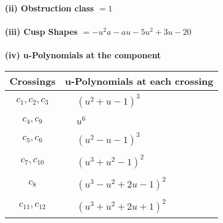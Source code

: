 \documentclass[1p]{elsarticle_modified}
\theoremstyle{definition}
\begin{document}
\flushleft \textbf{(ii) Obstruction class $= 1$}\\~\\
\flushleft \textbf{(iii) Cusp Shapes $= - u^2 a- a u-5 u^2+3 u-20$}\\~\\
\newpage\renewcommand{\arraystretch}{1}
\flushleft \textbf{(iv) u-Polynomials at the component}\newline \\
\begin{tabular}{m{50pt}|m{274pt}}
Crossings & \hspace{64pt}u-Polynomials at each crossing \\
\hline $$\begin{aligned}c_{1},c_{2},c_{3}\end{aligned}$$&$\begin{aligned}
&(u^2+u-1)^3
\end{aligned}$\\
\hline $$\begin{aligned}c_{4},c_{9}\end{aligned}$$&$\begin{aligned}
&u^6
\end{aligned}$\\
\hline $$\begin{aligned}c_{5},c_{6}\end{aligned}$$&$\begin{aligned}
&(u^2- u-1)^3
\end{aligned}$\\
\hline $$\begin{aligned}c_{7},c_{10}\end{aligned}$$&$\begin{aligned}
&(u^3+u^2-1)^2
\end{aligned}$\\
\hline $$\begin{aligned}c_{8}\end{aligned}$$&$\begin{aligned}
&(u^3- u^2+2 u-1)^2
\end{aligned}$\\
\hline $$\begin{aligned}c_{11},c_{12}\end{aligned}$$&$\begin{aligned}
&(u^3+u^2+2 u+1)^2
\end{aligned}$\\
\hline
\end{tabular}\\~\\
\end{document}
